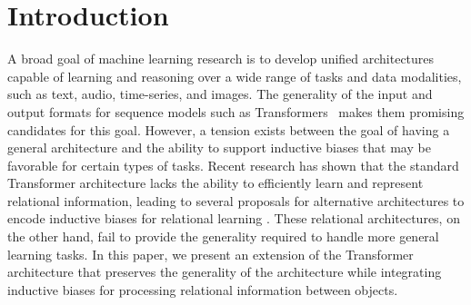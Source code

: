 \section{Introduction}\label{sec:intro}

A broad goal of machine learning research is to develop unified architectures capable of learning and reasoning over a wide range of tasks and data modalities, such as text, audio, time-series, and images. The generality of the input and output formats for sequence models such as Transformers~\citep{vaswani2017attention} makes them promising candidates for this goal. However, a tension exists between the goal of having a general architecture and the ability to support inductive biases that may be favorable for certain types of tasks. Recent research has shown that the standard Transformer architecture lacks the ability to efficiently learn and represent relational information, leading to several proposals for alternative architectures to encode inductive biases for relational learning \citep{santoroSimpleNeuralNetwork2017,santoroRelationalRecurrentNeural2018,shanahanExplicitlyRelationalNeurala,webbEmergentSymbolsBinding2021,webbRelationalBottleneckInductive2024,kergNeuralArchitectureInductive2022,altabaa2024abstractors,altabaaLearningHierarchicalRelational2024}. These relational architectures, on the other hand, fail to provide the generality required to handle more general learning tasks. In this paper, we present an extension of the Transformer architecture that preserves the generality of the architecture while integrating inductive biases for processing relational information between objects.

